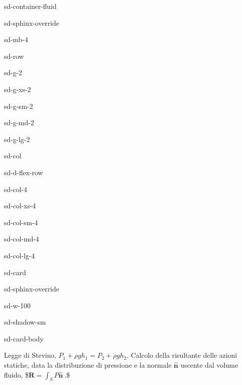 \documentclass[letterpaper,10pt,italian]{jupyterBook}
\begin{document}
\begin{sphinxuseclass}{sd-container-fluid}
\begin{sphinxuseclass}{sd-sphinx-override}
\begin{sphinxuseclass}{sd-mb-4}
\begin{sphinxuseclass}{sd-row}
\begin{sphinxuseclass}{sd-g-2}
\begin{sphinxuseclass}{sd-g-xs-2}
\begin{sphinxuseclass}{sd-g-sm-2}
\begin{sphinxuseclass}{sd-g-md-2}
\begin{sphinxuseclass}{sd-g-lg-2}
\begin{sphinxuseclass}{sd-col}
\begin{sphinxuseclass}{sd-d-flex-row}
\begin{sphinxuseclass}{sd-col-4}
\begin{sphinxuseclass}{sd-col-xs-4}
\begin{sphinxuseclass}{sd-col-sm-4}
\begin{sphinxuseclass}{sd-col-md-4}
\begin{sphinxuseclass}{sd-col-lg-4}
\begin{sphinxuseclass}{sd-card}
\begin{sphinxuseclass}{sd-sphinx-override}
\begin{sphinxuseclass}{sd-w-100}
\begin{sphinxuseclass}{sd-shadow-sm}
\begin{sphinxuseclass}{sd-card-body}
\end{sphinxuseclass}
\end{sphinxuseclass}
\end{sphinxuseclass}
\end{sphinxuseclass}
\end{sphinxuseclass}
\end{sphinxuseclass}
\end{sphinxuseclass}
\end{sphinxuseclass}
\end{sphinxuseclass}
\end{sphinxuseclass}
\end{sphinxuseclass}
\end{sphinxuseclass}
\end{sphinxuseclass}
\end{sphinxuseclass}
\end{sphinxuseclass}
\end{sphinxuseclass}
\end{sphinxuseclass}
\end{sphinxuseclass}
\end{sphinxuseclass}
\end{sphinxuseclass}
\end{sphinxuseclass}
\sphinxAtStartPar
{} Legge di Stevino, \(P_1 + \rho g h_1 = P_2 + \rho g h_2\). Calcolo della
risultante delle azioni statiche, data la distribuzione di pressione e
la normale \(\mathbf{\hat{n}}\) uscente dal volume fluido,
\$\(\mathbf{R} = \int_{S} P \mathbf{\hat{n}} \ .\)\$
\end{document}

